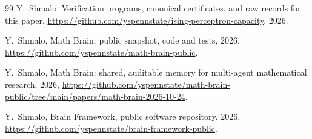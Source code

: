 \documentclass[11pt]{article}
\begin{document}
\begin{thebibliography}{99}
Y.~Shmalo,
Verification programs, canonical certificates, and raw records for this paper,
\url{https://github.com/yspennstate/ising-perceptron-capacity}, 2026.

Y.~Shmalo,
Math Brain: public snapshot, code and tests, 2026,
\url{https://github.com/yspennstate/math-brain-public}.

Y.~Shmalo,
Math Brain: shared, auditable memory for multi-agent mathematical research, 2026,
\url{https://github.com/yspennstate/math-brain-public/tree/main/papers/math-brain-2026-10-24}.

Y.~Shmalo,
Brain Framework, public software repository, 2026,
\url{https://github.com/yspennstate/brain-framework-public}.

\end{thebibliography}
\end{document}
